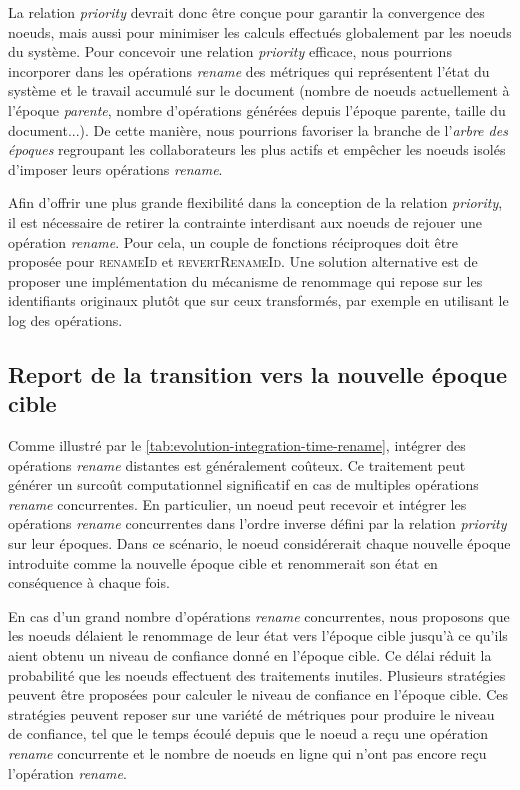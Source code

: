 \documentclass[12pt]{thesul}
\begin{document}
La relation \emph{priority} devrait donc être conçue pour garantir la convergence des noeuds, mais aussi pour minimiser les calculs effectués globalement par les noeuds du système.
Pour concevoir une relation \emph{priority} efficace, nous pourrions incorporer dans les opérations \emph{rename} des métriques qui représentent l'état du système et le travail accumulé sur le document (nombre de noeuds actuellement à l'époque \emph{parente}, nombre d'opérations générées depuis l'époque parente, taille du document...).
De cette manière, nous pourrions favoriser la branche de l'\emph{arbre des époques} regroupant les collaborateurs les plus actifs et empêcher les noeuds isolés d'imposer leurs opérations \emph{rename}.

Afin d'offrir une plus grande flexibilité dans la conception de la relation \emph{priority}, il est nécessaire de retirer la contrainte interdisant aux noeuds de rejouer une opération \emph{rename}.
Pour cela, un couple de fonctions réciproques doit être proposée pour \textsc{renameId} et \textsc{revertRenameId}.
Une solution alternative est de proposer une implémentation du mécanisme de renommage qui repose sur les identifiants originaux plutôt que sur ceux transformés, par exemple en utilisant le log des opérations.

\subsection{Report de la transition vers la nouvelle époque cible}

\label{sec:report-transition-to-target-epoch}

Comme illustré par le \autoref{tab:evolution-integration-time-rename}, intégrer des opérations \emph{rename} distantes est généralement coûteux.
Ce traitement peut générer un surcoût computationnel significatif en cas de multiples opérations \emph{rename} concurrentes.
En particulier, un noeud peut recevoir et intégrer les opérations \emph{rename} concurrentes dans l'ordre inverse défini par la relation \emph{priority} sur leur époques.
Dans ce scénario, le noeud considérerait chaque nouvelle époque introduite comme la nouvelle époque cible et renommerait son état en conséquence à chaque fois.


En cas d'un grand nombre d'opérations \emph{rename} concurrentes, nous proposons que les noeuds délaient le renommage de leur état vers l'époque cible jusqu'à ce qu'ils aient obtenu un niveau de confiance donné en l'époque cible.
Ce délai réduit la probabilité que les noeuds effectuent des traitements inutiles.
Plusieurs stratégies peuvent être proposées pour calculer le niveau de confiance en l'époque cible.
Ces stratégies peuvent reposer sur une variété de métriques pour produire le niveau de confiance, tel que le temps écoulé depuis que le noeud a reçu une opération \emph{rename} concurrente et le nombre de noeuds en ligne qui n'ont pas encore reçu l'opération \emph{rename}.
\end{document}
